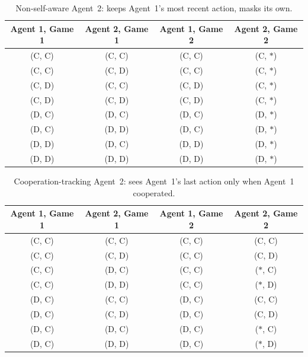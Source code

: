 \documentclass{article}
\begin{document}
\begin{table}[h!]
  \caption{Non-self-aware Agent~2: keeps Agent~1's most recent action, masks its own.}
  \label{tab:exp-nonself}
  \centering
  \begin{tabular}{cccc}
    \toprule
    Agent 1, Game 1 & Agent 2, Game 1 & Agent 1, Game 2 & Agent 2, Game 2 \\
    \midrule
    (C, C) & (C, C) & (C, C) & (C, $*$) \\
    (C, C) & (C, D) & (C, C) & (C, $*$) \\
    (C, D) & (C, C) & (C, D) & (C, $*$) \\
    (C, D) & (C, D) & (C, D) & (C, $*$) \\
    (D, C) & (D, C) & (D, C) & (D, $*$) \\
    (D, C) & (D, D) & (D, C) & (D, $*$) \\
    (D, D) & (D, C) & (D, D) & (D, $*$) \\
    (D, D) & (D, D) & (D, D) & (D, $*$) \\
    \bottomrule
  \end{tabular}
\end{table}

\begin{table}[h!]
  \caption{Cooperation-tracking Agent~2: sees Agent~1's last action only when Agent~1 cooperated.}
  \label{tab:exp-coop}
  \centering
  \begin{tabular}{cccc}
    \toprule
    Agent 1, Game 1 & Agent 2, Game 1 & Agent 1, Game 2 & Agent 2, Game 2 \\
    \midrule
    (C, C) & (C, C) & (C, C) & (C, C) \\
    (C, C) & (C, D) & (C, C) & (C, D) \\
    (C, C) & (D, C) & (C, C) & ($*$, C) \\
    (C, C) & (D, D) & (C, C) & ($*$, D) \\
    (D, C) & (C, C) & (D, C) & (C, C) \\
    (D, C) & (C, D) & (D, C) & (C, D) \\
    (D, C) & (D, C) & (D, C) & ($*$, C) \\
    (D, C) & (D, D) & (D, C) & ($*$, D) \\
    \bottomrule
  \end{tabular}
\end{table}
\end{document}
